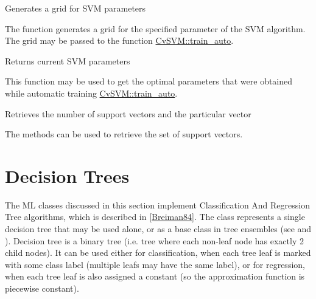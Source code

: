 
Generates a grid for SVM parameters


\begin{description}
\end{description}

The function generates a grid for the specified parameter of the SVM algorithm. The grid may be passed to the function \href{#CvSVM.3A.3Atrainauto}{CvSVM::train\_auto}.



Returns current SVM parameters


This function may be used to get the optimal parameters that were obtained while automatic training \href{#CvSVM.3A.3Atrainauto}{CvSVM::train\_auto}.



Retrieves the number of support vectors and the particular vector


The methods can be used to retrieve the set of support vectors.

\section{Decision Trees}


The ML classes discussed in this section implement Classification And Regression Tree algorithms, which is described in \href{#paper_Breiman84}{[Breiman84]}.
\newline
\newline
The class  represents a single decision tree that may be used alone, or as a base class in tree ensembles (see  and ).
\newline
\newline
Decision tree is a binary tree (i.e. tree where each non-leaf node has exactly 2 child nodes). It can be used either for classification, when each tree leaf is marked with some class label (multiple leafs may have the same label), or for regression, when each tree leaf is also assigned a constant (so the approximation function is piecewise constant).

